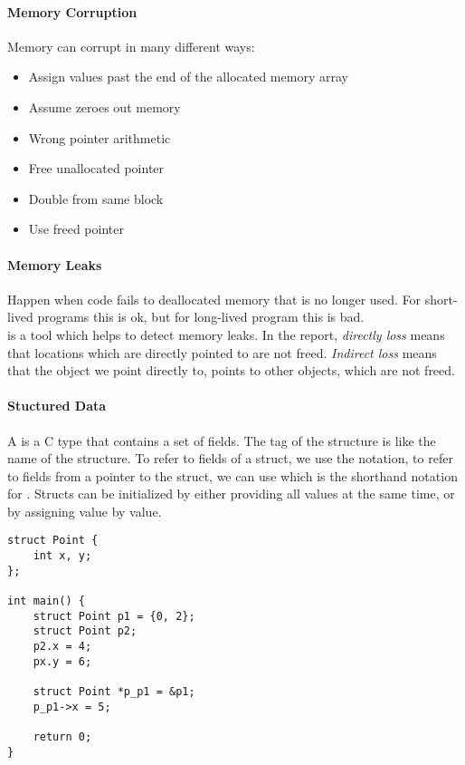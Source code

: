 \paragraph{Memory Corruption}
Memory can corrupt in many different ways:
\begin{itemize}
    \item Assign values past the end of the allocated memory array
    \item Assume  zeroes out memory
    \item Wrong pointer arithmetic
    \item Free unallocated pointer
    \item Double from same block
    \item Use freed pointer
\end{itemize}

\paragraph{Memory Leaks}
Happen when code fails to deallocated memory that is no longer used. For short-lived programs this is ok, but for long-lived program this is bad.\\
 is a tool which helps to detect memory leaks. In the report, \textit{directly loss} means that locations which are directly pointed to are not freed. \textit{Indirect loss} means that the object we point directly to, points to other objects, which are not freed.


\paragraph{Stuctured Data}
A  is a C type that contains a set of fields. The tag of the structure is like the name of the structure. To refer to fields of a struct, we use the  notation, to refer to fields from a pointer to the struct, we can use  which is the shorthand notation for . Structs can be initialized by either providing all values at the same time, or by assigning value by value.

\begin{lstlisting}
struct Point {
    int x, y;
};

int main() {
    struct Point p1 = {0, 2};
    struct Point p2;
    p2.x = 4;
    px.y = 6;

    struct Point *p_p1 = &p1;
    p_p1->x = 5;

    return 0;
}
\end{lstlisting}


